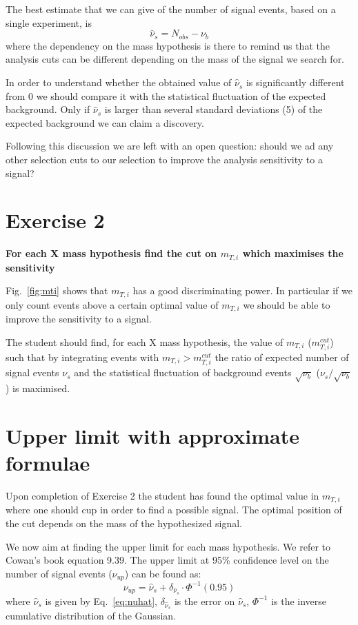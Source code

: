 \documentclass[a4paper,12pt]{article}
\begin{document}
The best estimate that we can give of the number of signal events, based on a
single experiment, is
\begin{equation}
\hat{\nu}_s=N_{obs}-\nu_b
\label{eq:nuhat}
\end{equation}
where the dependency on the mass hypothesis is there to remind us that the
analysis cuts can be different depending on the mass of the signal we search
for.

In order to understand whether the obtained value of $\hat{\nu}_s$ is
significantly different from 0 we should compare it with the statistical
fluctuation of the expected background. Only if $\hat{\nu}_s$ is larger
than several standard deviations (5) of the expected background we can claim a
discovery.

Following this discussion we are left with an open question: should we ad any
other selection cuts to our selection to improve the analysis sensitivity to a
signal?

\section*{Exercise 2}
{\bf For each X mass hypothesis find the cut on $m_{T,i}$ which maximises the
sensitivity}

Fig.~\ref{fig:mti} shows that $m_{T,i}$ has a good discriminating power. In
particular if we only count events above a certain optimal value of  $m_{T,i}$ we
should be able to improve the sensitivity to a signal. 

The student should find, for each X mass hypothesis, the value of $m_{T,i}$
($m_{T,i}^{cut}$) such that by integrating events with
$m_{T,i}>m_{T,i}^{cut}$ the ratio of expected number of signal events
$\nu_s$ and the statistical fluctuation of background events
$\sqrt{\nu_b}$ ($\nu_s/\sqrt{\nu_b}$) is maximised.

\section{Upper limit with approximate formulae}
Upon completion of Exercise 2 the student has found the optimal value in
$m_{T,i}$ where one should cup in order to find a possible signal. The optimal
position of the cut depends on the mass of the hypothesized signal.

We now aim at finding the upper limit for each mass hypothesis.
We refer to Cowan's book equation 9.39. The upper limit at 95\% confidence
level on the number of signal events ($\nu_{up}$) can be found as:
\begin{equation}
\nu_{up} = \hat{\nu}_s + \delta_{\hat{\nu}_s}\cdot\Phi^{-1}(0.95)
\label{eq:limitcowan}
\end{equation}
where $\hat{\nu}_s$ is given by Eq.~\ref{eq:nuhat}, $\delta_{\hat{\nu}_s}$ 
is the error on $\hat{\nu}_s$, $\Phi^{-1}$ is the inverse cumulative distribution 
of the Gaussian.
\end{document}
